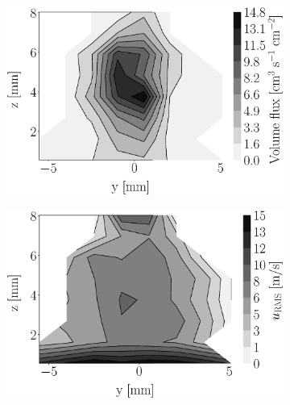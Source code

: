\begin{figure}[h!]
\begin{subfigure}[b]{0.22\textwidth}
	\centering
   \includegraphics[scale=0.17]{./part2_developments/figures_ch5_resolved_JICF/injectors_SLI/uG75_dx20_x10_volume_flux_map.eps}
\end{subfigure}
   \hspace{0.17in}
\begin{subfigure}[b]{0.22\textwidth}
	\centering
   \includegraphics[scale=0.17]{./part2_developments/figures_ch5_resolved_JICF/injectors_SLI/uG75_dx20_x10_ux_rms_map.eps}
\end{subfigure}
   \hspace{0.17in}
\begin{subfigure}[b]{0.22\textwidth}
	\centering

\end{subfigure}
\end{figure}
